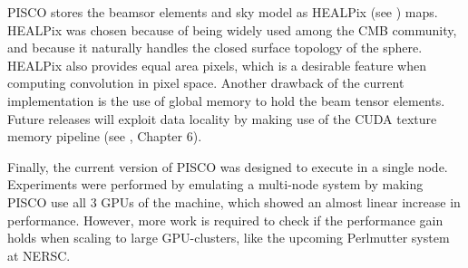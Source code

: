 \documentclass[a4paper,11pt]{article}
\begin{document}
PISCO stores the beamsor elements and sky model as HEALPix (see \cite{2005ApJ...622..759G}) maps. HEALPix was chosen because of being widely used among the CMB community, and because it naturally handles the closed surface topology of the sphere. HEALPix also provides equal area pixels, which is a desirable feature when computing convolution in pixel space. Another drawback of the current implementation is the use of global memory to hold the beam tensor elements. Future releases will exploit data locality by making use of the CUDA texture memory pipeline (see \cite{sanders2010cuda}, Chapter 6). 

Finally, the current version of PISCO was designed to execute in a single node. Experiments were performed by emulating a multi-node system by making PISCO use all 3 GPUs of the machine, which showed an almost linear increase in performance. However, more work is required to check if the performance gain holds when scaling to large GPU-clusters, like the upcoming Perlmutter system at NERSC.


\end{document}
